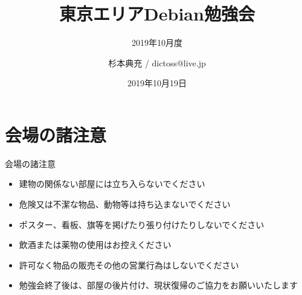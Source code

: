 \title{東京エリアDebian勉強会}
\subtitle{2019年10月度} %
\author{杉本典充 / dictoss@live.jp}
\date{2019年10月19日}



\begin{frame}
\titlepage{}
\end{frame}

\section{会場の諸注意}

\begin{frame}{会場の諸注意}
\begin{itemize}
\item 建物の関係ない部屋には立ち入らないでください
\item 危険又は不潔な物品、動物等は持ち込まないでください
\item ポスター、看板、旗等を掲げたり張り付けたりしないでください
\item 飲酒または薬物の使用はお控えください
\item 許可なく物品の販売その他の営業行為はしないでください
\item 勉強会終了後は、部屋の後片付け、現状復帰のご協力をお願いいたします
\end{itemize} 
\end{frame}


